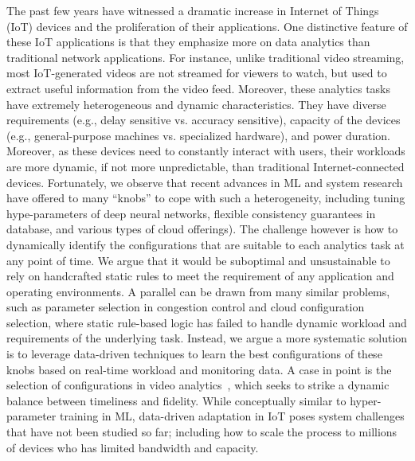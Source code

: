 The past few years have witnessed a dramatic increase in 
Internet of Things (IoT) devices and the proliferation of their applications. One 
distinctive feature of
these IoT applications is that they emphasize more on data analytics than 
traditional network applications. For instance, unlike traditional video
streaming, most IoT-generated videos are not streamed for viewers 
to watch, but used  to extract useful 
information from the video feed. 
Moreover, these analytics tasks have extremely heterogeneous and dynamic 
characteristics.
They have diverse requirements (e.g., delay sensitive vs. accuracy sensitive),  
capacity of the devices (e.g., general-purpose machines vs. 
specialized hardware), and power duration.
Moreover, as these devices need to constantly interact with users, 
their workloads are more dynamic, if not more unpredictable, than traditional
Internet-connected devices.
Fortunately, we observe that recent advances in ML and system research 
have offered to 
many ``knobs'' to cope with such a heterogeneity, including 
tuning hype-parameters of deep neural networks, 
flexible consistency guarantees in database, and various types of
cloud offerings).
The challenge however is how to dynamically identify the configurations
that are suitable to each analytics task at any point of time.
We argue that it would be suboptimal and unsustainable to rely on handcrafted
static rules to meet the requirement of any application and 
operating environments.
A parallel can be drawn from many similar problems, such as parameter
selection in congestion control and cloud configuration selection, where
static rule-based logic has failed to handle dynamic workload and
requirements of the underlying task.
Instead, we argue a more systematic solution is to leverage data-driven
techniques to learn the best configurations of these knobs based on
real-time workload and monitoring data.
A case in point is the selection of configurations in video 
analytics~\cite{zhang2017live}, which seeks to strike a dynamic 
balance between
timeliness and fidelity.
While conceptually similar to hyper-parameter training in 
ML, data-driven adaptation in IoT poses system challenges that have 
not been studied so far; including how to scale the process to millions of
devices who has limited bandwidth and capacity.


